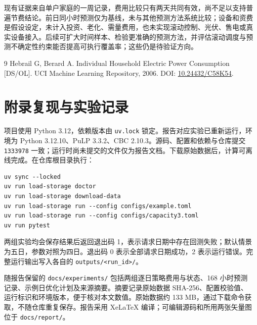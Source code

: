 \documentclass[fontset=windows,12pt,a4paper]{ctexart}
\begin{document}
现有证据来自单户家庭的一周记录，费用比较只有两天共同有效，尚不足以支持普遍节费结论。前日同小时预测仅为基线，未与其他预测方法系统比较；设备和资费是假设设定，未计入投资、老化、需量费用，也未实现滚动控制、光伏、售电或真实设备接入。后续可扩大时间样本、检验更准确的预测方法，并评估滚动调度与预测不确定性约束能否提高可执行覆盖率；这些仍是待验证方向。

\begin{thebibliography}{9}
\small
{} Hebrail G, Berard A. Individual Household Electric Power Consumption [DS/OL]. UCI Machine Learning Repository, 2006. DOI: \href{https://doi.org/10.24432/C58K54}{10.24432/C58K54}.
\end{thebibliography}

\section*{附录\quad 复现与实验记录}
\small
项目使用 Python 3.12，依赖版本由 \texttt{uv.lock} 锁定。报告对应实验已重新运行，环境为 Python 3.12.10、PuLP 3.3.2、CBC 2.10.3。源码、配置和依赖与仓库提交 \texttt{1333978} 一致；运行时尚未提交的文件仅为报告文档。下载原始数据后，计算可离线完成。在仓库根目录执行：
\begin{lstlisting}
uv sync --locked
uv run load-storage doctor
uv run load-storage download-data
uv run load-storage run --config configs/example.toml
uv run load-storage run --config configs/capacity3.toml
uv run pytest
\end{lstlisting}
两组实验均会保存结果后返回退出码 1，表示请求日期中存在回测失败；默认情景为五日，参数对照为四日。退出码 0 表示全部请求日期成功，2 表示运行错误。完整运行输出写入各自的 \texttt{outputs/<run\_id>/}。

随报告保留的 \texttt{docs/experiments/} 包括两组逐日策略费用与状态、168 小时预测记录、示例日优化计划及来源摘要。摘要记录原始数据 SHA-256、配置校验值、运行标识和环境版本，便于核对本文数值。原始数据约 133 MB，通过下载命令获取，不随仓库重复保存。报告采用 XeLaTeX 编译；可编辑源码和所用两张矢量图位于 \texttt{docs/report/}。
\end{document}
